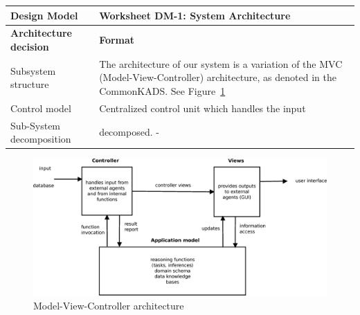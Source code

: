 \begin{tabular}%
		{|p{3cm}%
        |p{9cm}|}
\hline
\bf Design Model 	& \bf Worksheet DM-1: System Architecture \\
\hline\hline
\bf Architecture decision	& \bf Format \\ 
\hline
{\sc Subsystem structure}	& 
The architecture of our system is a variation of the MVC (Model-View-Controller) architecture, as denoted in the CommonKADS. See Figure~\ref{fig:MVC}
 \\
\hline
{\sc Control model} &
Centralized control unit which handles the input
\\
\hline
{\sc Sub-System decomposition} &
decomposed. \newline
 - %
 \\
\hline
\end{tabular}

\begin{figure}[h]
\centering
\includegraphics[width=\textwidth]{images/mvc.eps}
\caption{Model-View-Controller architecture}
\label{fig:MVC}
\end{figure}